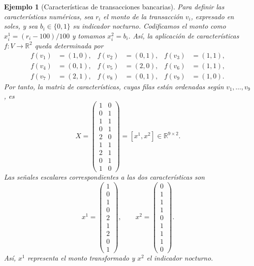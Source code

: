 \documentclass[a4paper,openany,oneside,10pt]{report}
\theoremstyle{pnlTeorema}
\theoremstyle{pnlDefinicion}
\theoremstyle{pnlObservacion}
\newtheorem{ejemplo}{Ejemplo}[section]
\begin{document}
\begin{ejemplo}[Características de transacciones bancarias]
Para definir las características numéricas, sea \(r_i\) el monto de la transacción \(v_i\), expresado en soles, y sea \(b_i\in\{0,1\}\) su indicador nocturno. Codificamos el monto como \(x_i^1=(r_i-100)/100\) y tomamos \(x_i^2=b_i\). Así, la aplicación de características \(f:V\to\mathbb R^2\) queda determinada por
\[
\begin{aligned}
f(v_1)&=(1,0),& f(v_2)&=(0,1),& f(v_3)&=(1,1),\\
f(v_4)&=(0,1),& f(v_5)&=(2,0),& f(v_6)&=(1,1),\\
f(v_7)&=(2,1),& f(v_8)&=(0,1),& f(v_9)&=(1,0).
\end{aligned}
\]
Por tanto, la matriz de características, cuyas filas están ordenadas según \(v_1,\ldots,v_9\), es
\[
X=\begin{pmatrix}
1&0\\
0&1\\
1&1\\
0&1\\
2&0\\
1&1\\
2&1\\
0&1\\
1&0
\end{pmatrix}
=[x^1,x^2]\in\mathbb R^{9\times2}.
\]
Las señales escalares correspondientes a las dos características son
\[
x^1=\begin{pmatrix}1\\0\\1\\0\\2\\1\\2\\0\\1\end{pmatrix},
\qquad
x^2=\begin{pmatrix}0\\1\\1\\1\\0\\1\\1\\1\\0\end{pmatrix}.
\]
Así, \(x^1\) representa el monto transformado y \(x^2\) el indicador nocturno.
\end{ejemplo}
\end{document}
